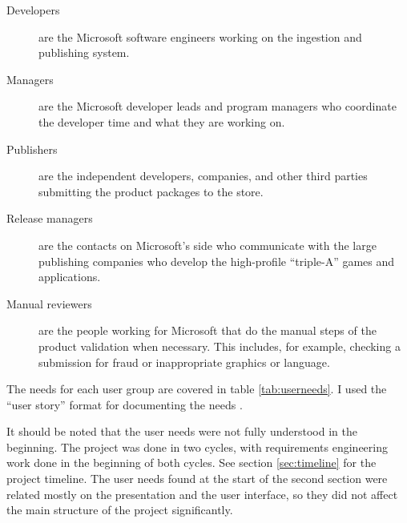 \begin{description}
\item[Developers] are the Microsoft software engineers working on the ingestion and publishing system.
\item[Managers] are the Microsoft developer leads and program managers who coordinate the developer time and what they are working on.
\item[Publishers] are the independent developers, companies, and other third parties submitting the product packages to the store.
\item[Release managers] are the contacts on Microsoft's side who communicate with the large publishing companies who develop the high-profile ``triple-A'' games and applications.
\item[Manual reviewers] are the people working for Microsoft that do the manual steps of the product validation when necessary. This includes, for example, checking a submission for fraud or inappropriate graphics or language.
\end{description}

The needs for each user group are covered in table \ref{tab:userneeds}.
I used the ``user story'' format for documenting the needs \cite{cohn2004user}.

It should be noted that the user needs were not fully understood in the beginning. The project was done in two cycles, with requirements engineering work done in the beginning of both cycles. See section \ref{sec:timeline} for the project timeline. 
The user needs found at the start of the second section were related mostly on the presentation and the user interface, so they did not affect the main structure of the project significantly.


